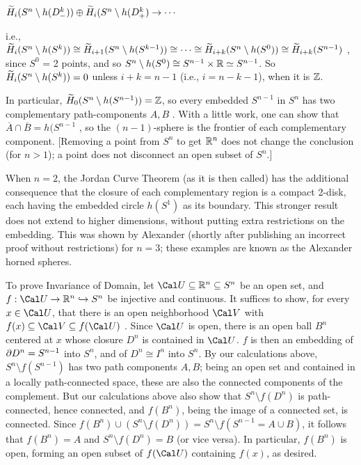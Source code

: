 \hfill $\widetilde{H}_{i}(S^n\setminus h(D^k_-))\oplus \widetilde{H}_{i}(S^n\setminus h(D^k_+)\rightarrow \cdots $

i.e., $\widetilde{H}_{i}(S^n\setminus h(S^k)) \cong \widetilde{H}_{i+1}(S^n\setminus h(S^{k-1})) 
\cong \cdots \cong \widetilde{H}_{i+k}(S^n\setminus h(S^0))\cong \widetilde{H}_{i+k}(S^{n-1})$ ,
since $S^0$ = 2 points, and  so $S^n\setminus h(S^0)\cong S^{n-1}\times {\Bbb R} \simeq S^{n-1}$.
So $\widetilde{H}_{i}(S^n\setminus h(S^k)) = 0$ unless $i+k=n-1$ (i.e., $i=n-k-1$), when it is ${\Bbb Z}$.

\ssk

In particular, $\widetilde{H}_0(S^n\setminus h(S^{n-1}))={\Bbb Z}$, so every embedded $S^{n-1}$ in $S^n$
has two complementary path-components $A,B$ . With a little work, one can show that
$\overline{A}\cap \overline{B} = h(S^{n-1}$ , so the $(n-1)$-sphere is the frontier of each
complementary component. [Removing a point from $S^n$ to get ${\Bbb R}^n$ does not change the
conclusion (for $n>1$); a point does not disconnect an open subset of $S^n$.]

\msk

When $n=2$, the Jordan Curve Theorem (as it is then called) has the additional
consequence that the closure of each complementary region is a compact 2-disk,
each having the embedded circle $h(S^1)$ as its boundary. This stronger result
does not extend to higher dimensions, without putting extra restrictions 
on the embedding. This was shown by Alexander (shortly after publishing an
incorrect proof without restrictions) for $n=3$; these examples are known as
the Alexander horned spheres.

\msk

To prove Invariance of Domain, let ${\Cal U}\subseteq \bbr^n\subseteq S^n$ be an open 
set, and $f:{\Cal U}\ra \bbr^n \hookrightarrow S^n$ be injective and continuous. It suffices
to show, for every $x\in {\Cal U}$, that there is an open neighborhood ${\Cal V}$ with
$f(x)\subseteq {\Cal V} \subseteq f({\Cal U})$ . Since ${\Cal U}$ is open,
there is an open ball $B^n$ centered at $x$ whose closure $D^n$ is contained in ${\Cal U}$. 
$f$ is then an embedding of $\partial D^n = S^{n-1}$ into $S^n$, and of $D^n\cong I^n$ into $S^n$.
By our calculations above, $S^n\setminus f(S^{n-1})$ has two path components $A,B$; being an open set 
and contained in a locally path-connected space, these are also the connected components
of the complement. But our calculations above also show that $S^n\setminus f(D^n)$ is
path-connected, hence connected, and $f(B^n)$, being the image of a connected set, is connected.
Since $f(B^n)\cup (S^n\setminus f(D^n)) = S^n\setminus f(S^{n-1} = A\cup B)$, it follows that
$f(B^n)=A$ and $S^n\setminus f(D^n) = B$ (or vice versa). In particular,
$f(B^n)$ is open, forming an open subset of $f({\Cal U})$ containing $f(x)$, as desired.

